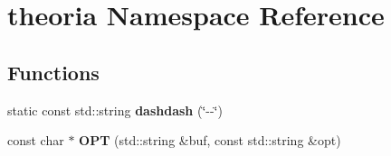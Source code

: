 \hypertarget{namespacetheoria}{\section{theoria Namespace Reference}
\label{namespacetheoria}
}
\subsection*{Functions}
\begin{DoxyCompactItemize}
\item 
\hypertarget{namespacetheoria_a2461ee397964667138bdba02d62d209e}{static const std\+::string {\bfseries dashdash} (\char`\"{}-\/-\/\char`\"{})}\label{namespacetheoria_a2461ee397964667138bdba02d62d209e}

\item 
\hypertarget{namespacetheoria_ad064111544bc341abc915fd30ee47659}{const char $\ast$ {\bfseries O\+P\+T} (std\+::string \&buf, const std\+::string \&opt)}\label{namespacetheoria_ad064111544bc341abc915fd30ee47659}

\end{DoxyCompactItemize}
